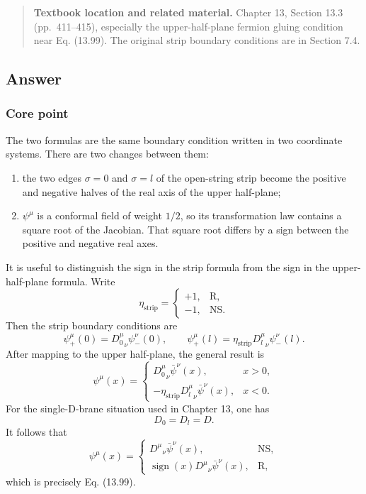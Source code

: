 \documentclass[
  10pt,
  a4paper,
  openany]{book}
\providecommand{\tightlist}{%
  \setlength{\itemsep}{0pt}\setlength{\parskip}{0pt}}
\begin{document}
\begin{quote}
\textbf{Textbook location and related material.} Chapter 13, Section
13.3 (pp.~411--415), especially the upper-half-plane fermion gluing
condition near Eq. (13.99). The original strip boundary conditions are
in Section 7.4.
\end{quote}

\subsection{Answer}\label{answer-17}

\subsubsection{Core point}\label{core-point-17}

The two formulas are the same boundary condition written in two
coordinate systems. There are two changes between them:

\begin{enumerate}
\def\labelenumi{\arabic{enumi}.}
\tightlist
\item
  the two edges \(\sigma=0\) and \(\sigma=l\) of the open-string strip
  become the positive and negative halves of the real axis of the upper
  half-plane;
\item
  \(\psi^\mu\) is a conformal field of weight \(1/2\), so its
  transformation law contains a square root of the Jacobian. That square
  root differs by a sign between the positive and negative real axes.
\end{enumerate}

It is useful to distinguish the sign in the strip formula from the sign
in the upper-half-plane formula. Write \[
\eta_{\mathrm{strip}}
=
\begin{cases}
+1,&\mathrm R,\\
-1,&\mathrm{NS}.
\end{cases}
\] Then the strip boundary conditions are \[
\psi_+^\mu(0)
={D_0^\mu}_{\nu}\psi_-^\nu(0),
\qquad
\psi_+^\mu(l)
=\eta_{\mathrm{strip}}{D_l^\mu}_{\nu}\psi_-^\nu(l).
\] After mapping to the upper half-plane, the general result is \[
\psi^\mu(x)
=
\begin{cases}
{D_0^\mu}_{\nu}\bar\psi^\nu(x),&x>0,\\[2mm]
-\eta_{\mathrm{strip}}{D_l^\mu}_{\nu}\bar\psi^\nu(x),&x<0.
\end{cases}
\] For the single-D-brane situation used in Chapter 13, one has \[
D_0=D_l=D.
\] It follows that \[
\psi^\mu(x)
=
\begin{cases}
{D^\mu}_{\nu}\bar\psi^\nu(x),&\mathrm{NS},\\[2mm]
\operatorname{sign}(x){D^\mu}_{\nu}\bar\psi^\nu(x),&\mathrm R,
\end{cases}
\] which is precisely Eq. (13.99).
\end{document}
